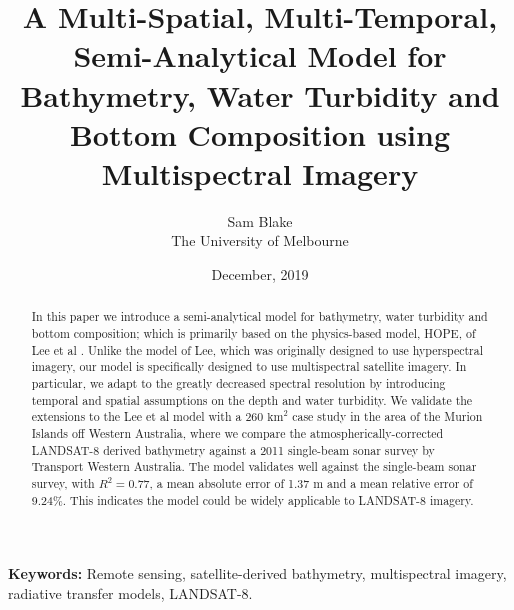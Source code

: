 \documentclass[12pt]{article}
\numberwithin{equation}{section}
\begin{document}
\title{A Multi-Spatial, Multi-Temporal, Semi-Analytical Model for Bathymetry, Water Turbidity and Bottom Composition using Multispectral Imagery}
\author{Sam Blake\\ The University of Melbourne}
\date{December, 2019}
\maketitle

\begin{abstract}
In this paper we introduce a semi-analytical model for bathymetry, water turbidity and bottom 
composition; which is primarily based on the physics-based model, HOPE, of Lee et al 
\cite{lee1998}\cite{lee1999}. Unlike the model of Lee, which was originally designed to 
use hyperspectral imagery, our model is specifically designed to use multispectral satellite 
imagery. In particular, we adapt to the greatly decreased spectral resolution by introducing 
temporal and spatial assumptions on the depth and water turbidity. We validate the extensions 
to the Lee et al model with a 260 $\text{km}^2$ case study in the area of the Murion Islands  
off Western Australia, where we compare the atmospherically-corrected LANDSAT-8 derived 
bathymetry against a 2011 single-beam sonar survey by Transport Western Australia. The model 
validates well against the single-beam sonar survey, with $R^2=0.77$, a mean absolute error 
of 1.37 m and a mean relative error of 9.24\%. This indicates the model could be widely 
applicable to LANDSAT-8 imagery. 
\end{abstract}

\textbf{Keywords:} Remote sensing, satellite-derived bathymetry, multispectral imagery, 
radiative transfer models, LANDSAT-8. \\
\end{document}
